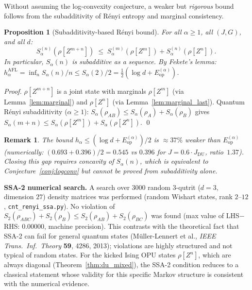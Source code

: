 \documentclass[12pt,a4paper]{article}
\newtheorem{proposition}[theorem]{Proposition}
\newtheorem{remark}[theorem]{Remark}
\begin{document}
Without assuming the log-convexity conjecture, a weaker but \emph{rigorous} bound follows
from the subadditivity of Rényi entropy and marginal consistency.

\begin{proposition}[Subadditivity-based Rényi bound]
\label{prop:subad_renyi}
For all $\alpha\geq 1$, all $(J,G)$, and all $d$:
\[
  S_\alpha^{(n)}(\rho[Z^{m+n}]) \;\leq\; S_\alpha^{(m)}(\rho[Z^m]) + S_\alpha^{(n)}(\rho[Z^n]).
\]
In particular, $S_\alpha(n)$ is subadditive as a sequence.
By Fekete's lemma: $h_\alpha^{\mathrm{AFL}} = \inf_n S_\alpha(n)/n \leq S_\alpha(2)/2 = \tfrac{1}{2}(\log d + E_{\mathrm{op}}^{(\alpha)})$.
\end{proposition}

\begin{proof}
$\rho[Z^{m+n}]$ is a joint state with marginals $\rho[Z^m]$ (via Lemma~\ref{lem:marginal})
and $\rho[Z^n]$ (via Lemma~\ref{lem:marginal_last}).
Quantum Rényi subadditivity ($\alpha\geq 1$): $S_\alpha(\rho_{AB})\leq S_\alpha(\rho_A)+S_\alpha(\rho_B)$
gives $S_\alpha(m+n)\leq S_\alpha(\rho[Z^m])+S_\alpha(\rho[Z^n])$. \qed
\end{proof}

\begin{remark}
The bound $h_\alpha\leq(\log d+E_{\mathrm{op}}^{(\alpha)})/2$ is $\approx 37\%$ weaker than $E_{\mathrm{op}}^{(\alpha)}$
(numerically: $(0.693+0.396)/2=0.545$ vs $0.396$ for $J=0.6\cdot J_{\mathrm{DU}}$, ratio~$1.37$).
Closing this gap requires concavity of $S_\alpha(n)$, which is equivalent to
Conjecture~\ref{conj:logconv} but cannot be proved from subadditivity alone.
\end{remark}

\noindent\textbf{SSA-2 numerical search.}
A search over 3000 random 3-qutrit ($d=3$, dimension $27$) density matrices was performed
(random Wishart states, rank $2$--$12$, \texttt{cnt\_renyi\_ssa.py}).
No violation of $S_2(\rho_{ABC})+S_2(\rho_B)\leq S_2(\rho_{AB})+S_2(\rho_{BC})$ was found
(max value of LHS$-$RHS: $0.00000$, machine precision).
This contrasts with the theoretical fact that SSA-2 can fail for general quantum states
(Müller-Lennert et al., \emph{IEEE Trans.\ Inf.\ Theory} \textbf{59}, 4286, 2013);
violations are highly structured and not typical of random states.
For the kicked Ising OPU states $\rho[Z^n]$, which are always diagonal
(Theorem~\ref{thm:du_mixed}), the SSA-2 condition reduces to a classical statement
whose validity for this specific Markov structure is consistent with the numerical evidence.
\end{document}
